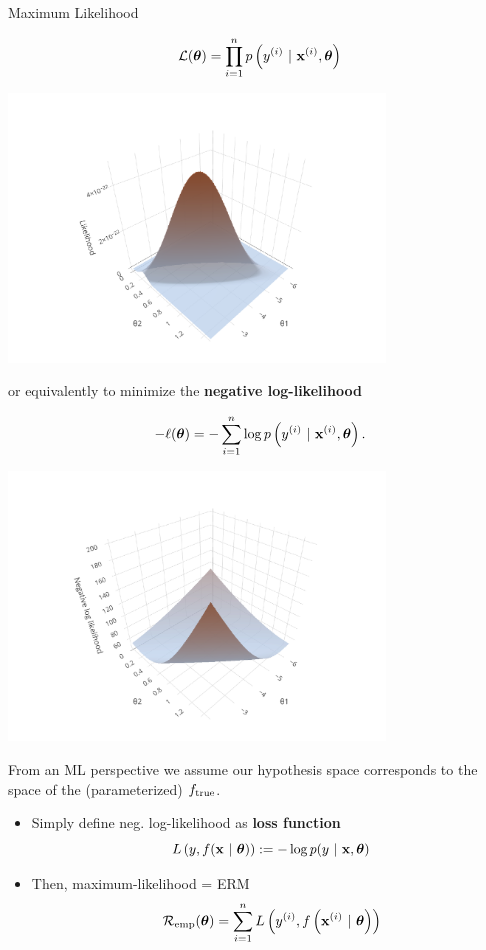 \documentclass[11pt,compress,t,notes=noshow, xcolor=table]{beamer}
\begin{document}
\begin{vbframe}{Maximum Likelihood}
\begin{itemize}
\begin{minipage}{0.5\textwidth}
$$ \mathcal{L}(\bm{\theta}) = \prod_{i=1}^n p\left(y^{(i)} ~|~\mathbf{x}^{(i)}, \bm{\theta}\right) $$
\end{minipage}%
\begin{minipage}{0.5\textwidth}
\includegraphics[width = 0.75\textwidth]{figure/log_reg_ml.pdf}
\end{minipage}

or equivalently to minimize the \textbf{negative log-likelihood}

\begin{minipage}{0.5\textwidth}
$$ -\ell(\bm{\theta}) = -\sum\limits_{i=1}^n \log p\left(y^{(i)} ~|~\mathbf{x}^{(i)}, \bm{\theta}\right). $$
\end{minipage}%
\begin{minipage}{0.5\textwidth}
\includegraphics[width = 0.75\textwidth]{figure/log_reg_erm.pdf}
\end{minipage}
\end{itemize}


\framebreak 

From an ML perspective we assume our hypothesis space corresponds to the space of the (parameterized) $f_{\text{true}}$. 

\begin{itemize}
\item Simply define neg. log-likelihood as \textbf{loss function} 
$$ L\left(y, f(\mathbf{x} ~|~ \bm{\theta})\right) := - \log p(y ~|~\mathbf{x}, \bm{\theta}) $$
\item Then, maximum-likelihood 
 = ERM
$$\mathcal{R}_{\text{emp}}(\bm{\theta}) = \sum\limits_{i=1}^n L\left(y^{(i)}, f\left(\mathbf{x}^{(i)} ~|~ \bm{\theta}\right)\right)$$


\end{itemize}
\end{vbframe}
\end{document}
